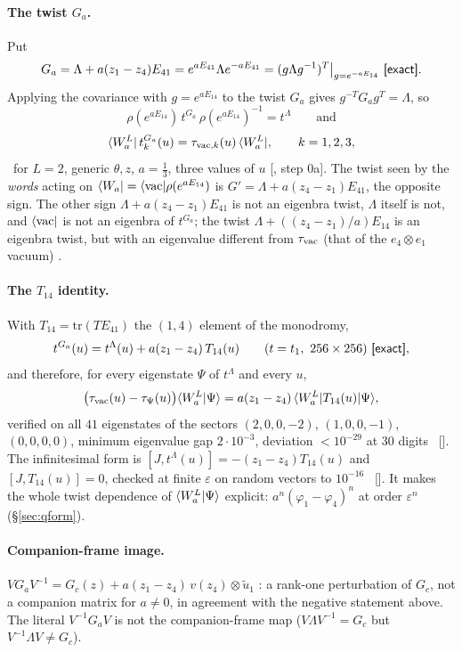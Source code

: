 \paragraph{The twist $G_a$.} Put
\begin{equation}
 G_a=\Lambda+a(z_1-z_4)E_{41}=e^{aE_{41}}\Lambda e^{-aE_{41}}=(g\Lambda g^{-1})^T\big|_{g=e^{-aE_{14}}}\ \textsf{[exact]} .
\end{equation}
Applying the covariance with $g=e^{aE_{14}}$ to the twist $G_a$ gives $g^{-T}G_ag^{T}=\Lambda$, so
\begin{equation}
 \rho(e^{aE_{14}})\,t^{G_a}\,\rho(e^{aE_{14}})^{-1}=t^\Lambda\qquad\text{and}
\end{equation}
\begin{equation}
 \langle W_a^L|\,t_k^{G_a}(u)=\tau_{{\rm vac},k}(u)\,\langle W_a^L|,\qquad k=1,2,3,
\end{equation}
\ex\ for $L=2$, generic $\theta,z$, $a=\tfrac13$, three values of $u$ [, step 0a].
The twist seen by the \emph{words} acting on $\langle W_a|=\langle\mathrm{vac}|\rho(e^{aE_{14}})$ is $G'=\Lambda+a(z_4-z_1)E_{41}$,
the opposite sign. The other sign $\Lambda+a(z_4-z_1)E_{41}$ is not an eigenbra twist, $\Lambda$ itself is not, and $\langle\mathrm{vac}|$
is not an eigenbra of $t^{G_a}$; the twist $\Lambda+((z_4-z_1)/a)E_{14}$ is an eigenbra twist, but with an eigenvalue different
from $\tau_{\rm vac}$ (that of the $e_4\otimes e_1$ vacuum) \ex.

\paragraph{The $T_{14}$ identity.} With $T_{14}=\mathrm{tr}(TE_{41})$ the $(1,4)$ element of the monodromy,
\begin{equation}
 t^{G_a}(u)=t^\Lambda(u)+a(z_1-z_4)\,T_{14}(u)\qquad(t=t_1,\ 256\times256)\ \ex ,
\end{equation}
and therefore, for every eigenstate $\Psi$ of $t^\Lambda$ and every $u$,
\begin{equation}
 \big(\tau_{\rm vac}(u)-\tau_\Psi(u)\big)\langle W_a^L|\Psi\rangle=a(z_1-z_4)\,\langle W_a^L|T_{14}(u)|\Psi\rangle,
\end{equation}
verified on all $41$ eigenstates of the sectors $(2,0,0,-2)$, $(1,0,0,-1)$, $(0,0,0,0)$, minimum eigenvalue gap
$2\cdot10^{-3}$, deviation $<10^{-29}$ at $30$ digits \hp\ []. The infinitesimal
form is $[J,t^\Lambda(u)]=-(z_1-z_4)T_{14}(u)$ and $[J,T_{14}(u)]=0$, checked at finite $\varepsilon$ on random vectors to
$10^{-16}$ \npy\ []. It makes the whole twist dependence of $\langle W_a^L|\Psi\rangle$ explicit: $a^n(\varphi_1-\varphi_4)^n$ at
order $\varepsilon^n$ (\S\ref{sec:qform}).

\paragraph{Companion-frame image.} $VG_aV^{-1}=G_c(z)+a(z_1-z_4)\,v(z_4)\otimes\tilde u_1$ \ex: a rank-one perturbation
of $G_c$, not a companion matrix for $a\ne0$, in agreement with the negative statement above. The literal
$V^{-1}G_aV$ is not the companion-frame map ($V\Lambda V^{-1}=G_c$ but $V^{-1}\Lambda V\ne G_c$).
